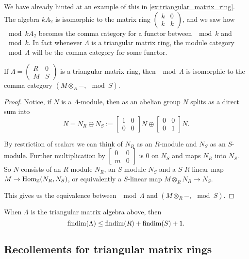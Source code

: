 We have already hinted at an example of this in \cref{ex:triangular_matrix_ring}. The algebra $kA_2$ is isomorphic to the matrix ring $\begin{pmatrix}
k & 0\\
k & k
\end{pmatrix}$, and we saw how $\mod kA_2$ becomes the comma category for a functor between $\mod k$ and $\mod k$. In fact whenever $\Lambda$ is a triangular matrix ring, the module category $\mod \Lambda$ will be the comma category for some functor.

\begin{prop}\label{prop:triangular_matrix_is_comma_cat}
	If $\Lambda = \begin{pmatrix}
	R & 0\\
	M & S
	\end{pmatrix}$ is a triangular matrix ring, then $\mod \Lambda$ is isomorphic to the comma category $(M \otimes_R -, \mod S)$.
	\begin{proof}
		Notice, if $N$ is a $\Lambda$-module, then as an abelian group $N$ splits as a direct sum into
		$$N= N_R \oplus N_S :=
		\begin{bmatrix}
		1 & 0\\
		0 & 0
		\end{bmatrix}N \oplus
		\begin{bmatrix}
		0 & 0\\
		0 & 1
		\end{bmatrix}N.$$
		
		By restriction of scalars we can think of $N_R$ as an $R$-module and $N_S$ as an $S$-module. Further multiplication by $\begin{bmatrix}
		0 & 0\\
		m & 0
		\end{bmatrix}$ is 0 on $N_S$ and maps $N_R$ into $N_S$. So $N$ consists of an $R$-module $N_R$, an $S$-module $N_S$ and a $S$-$R$-linear map $M \to \operatorname{Hom}_\mathbb{Z}(N_R, N_S)$, or equivalently a $S$-linear map $M \otimes_R N_R \to N_S$.
		
		This gives us the equivalence between $\mod \Lambda$ and $(M \otimes_R -, \mod S)$.
	\end{proof}
\end{prop} 

\begin{cor}
	When $\Lambda$ is the triangular matrix algebra above, then 
	$$\operatorname{findim}(\Lambda) \leq \operatorname{findim}(R) + \operatorname{findim}(S)+1.$$
\end{cor}

\subsection{Recollements for triangular matrix rings}

